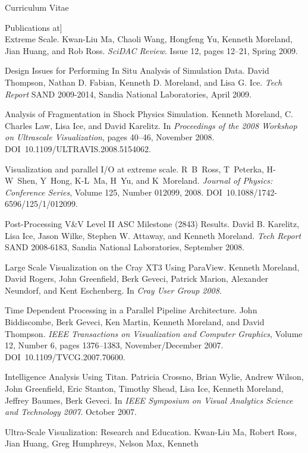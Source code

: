 \documentclass{article}
\begin{document}
\begin{cv}{Curriculum Vitae}
\begin{cvlist}{Publications}
      at]~\\ Extreme Scale. Kwan-Liu Ma, Chaoli Wang, Hongfeng Yu, Kenneth
      Moreland, Jian Huang, and Rob Ross. \emph{SciDAC Review}. Issue 12,
      pages 12--21, Spring 2009.
    \item[Design Issues for Performing In Situ Analysis of Simulation
      Data.] David Thompson, Nathan D. Fabian, Kenneth D. Moreland, and
      Lisa G. Ice. \emph{Tech Report} SAND 2009-2014, Sandia National
      Laboratories, April 2009.
    \item[Analysis of Fragmentation in Shock Physics Simulation.] Kenneth
      Moreland, C. Charles Law, Lisa Ice, and David Karelitz. In
      \emph{Proceedings of the 2008 Workshop on Ultrascale Visualization},
      pages 40--46, November 2008. DOI~10.1109/ULTRAVIS.2008.5154062.
    \item[Visualization and parallel I/O at extreme scale.] R~B~Ross,
      T~Peterka, H-W~Shen, Y~Hong, K-L~Ma, H~Yu, and
      K~Moreland. \emph{Journal of Physics: Conference Series}, Volume 125,
      Number 012099, 2008. DOI~10.1088/1742-6596/125/1/012099.
    \item[Post-Processing V\&V Level II ASC Milestone (2843) Results.] David
      B. Karelitz, Lisa Ice, Jason Wilke, Stephen W. Attaway, and Kenneth
      Moreland. \emph{Tech Report} SAND 2008-6183, Sandia National
      Laboratories, September 2008.
    \item[Large Scale Visualization on the Cray XT3 Using ParaView.]
      Kenneth Moreland, David Rogers, John Greenfield, Berk Geveci, Patrick
      Marion, Alexander Neundorf, and Kent Eschenberg. In \emph{Cray User
        Group 2008}.
    \item[Time Dependent Processing in a Parallel Pipeline Architecture.]
      John Biddiscombe, Berk Geveci, Ken Martin, Kenneth Moreland, and
      David Thompson.  \emph{IEEE Transactions on Visualization and
        Computer Graphics}, Volume 12, Number 6, pages 1376--1383,
      November/December 2007.  DOI~10.1109/TVCG.2007.70600.
    \item[Intelligence Analysis Using Titan.] Patricia Crossno, Brian
      Wylie, Andrew Wilson, John Greenfield, Eric Stanton, Timothy Shead,
      Lisa Ice, Kenneth Moreland, Jeffrey Baumes, Berk Geveci. In
      \emph{IEEE Symposium on Visual Analytics Science and Technology
        2007}. October 2007.
    \item[Ultra-Scale Visualization: Research and Education.] Kwan-Liu Ma,
      Robert Ross, Jian Huang, Greg Humphreys, Nelson Max, Kenneth

\end{cvlist}
\end{cv}
\end{document}
